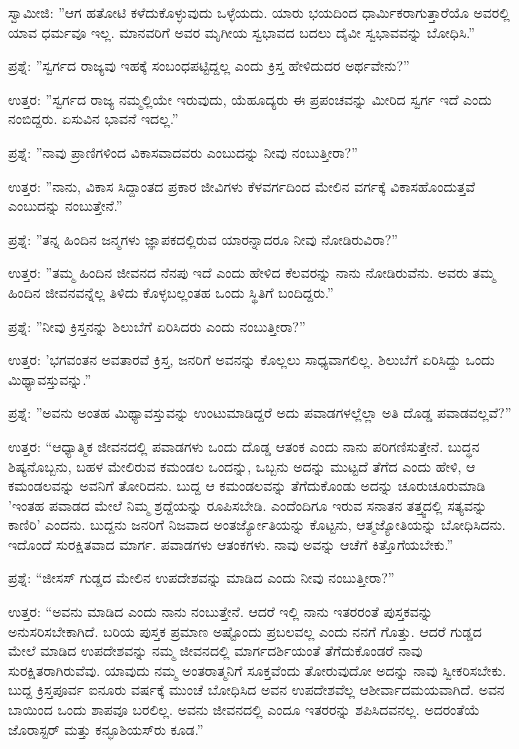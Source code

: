 ಸ್ವಾಮೀಜಿ: ''ಆಗ ಹತೋಟಿ ಕಳೆದುಕೊಳ್ಳುವುದು ಒಳ್ಳೆಯದು. ಯಾರು ಭಯದಿಂದ ಧಾರ್ಮಿಕರಾಗುತ್ತಾರೆಯೊ ಅವರಲ್ಲಿ ಯಾವ ಧರ್ಮವೂ ಇಲ್ಲ. ಮಾನವರಿಗೆ ಅವರ ಮೃಗೀಯ ಸ್ವಭಾವದ ಬದಲು ದೈವೀ ಸ್ವಭಾವವನ್ನು ಬೋಧಿಸಿ.”

ಪ್ರಶ್ನೆ: ''ಸ್ವರ್ಗದ ರಾಜ್ಯವು ಇಹಕ್ಕೆ ಸಂಬಂಧಪಟ್ಟಿದ್ದಲ್ಲ ಎಂದು ಕ್ರಿಸ್ತ ಹೇಳಿದುದರ ಅರ್ಥವೇನು?''

ಉತ್ತರ: ''ಸ್ವರ್ಗದ ರಾಜ್ಯ ನಮ್ಮಲ್ಲಿಯೇ ಇರುವುದು, ಯೆಹೂದ್ಯರು ಈ ಪ್ರಪಂಚವನ್ನು ಮೀರಿದ ಸ್ವರ್ಗ ಇದೆ ಎಂದು ನಂಬಿದ್ದರು. ಏಸುವಿನ ಭಾವನೆ ಇದಲ್ಲ.”

ಪ್ರಶ್ನೆ: ''ನಾವು ಪ್ರಾಣಿಗಳಿಂದ ವಿಕಾಸವಾದವರು ಎಂಬುದನ್ನು ನೀವು ನಂಬುತ್ತೀರಾ?''

ಉತ್ತರ: ''ನಾನು, ವಿಕಾಸ ಸಿದ್ದಾಂತದ ಪ್ರಕಾರ ಜೀವಿಗಳು ಕೆಳವರ್ಗದಿಂದ ಮೇಲಿನ ವರ್ಗಕ್ಕೆ ವಿಕಾಸಹೊಂದುತ್ತವೆ ಎಂಬುದನ್ನು ನಂಬುತ್ತೇನೆ.”

ಪ್ರಶ್ನೆ: ''ತನ್ನ ಹಿಂದಿನ ಜನ್ಮಗಳು ಜ್ಞಾಪಕದಲ್ಲಿರುವ ಯಾರನ್ನಾದರೂ ನೀವು ನೋಡಿರುವಿರಾ?”

ಉತ್ತರ: ''ತಮ್ಮ ಹಿಂದಿನ ಜೀವನದ ನೆನಪು ಇದೆ ಎಂದು ಹೇಳಿದ ಕೆಲವರನ್ನು ನಾನು ನೋಡಿರುವೆನು. ಅವರು ತಮ್ಮ ಹಿಂದಿನ ಜೀವನವನ್ನೆಲ್ಲ ತಿಳಿದು ಕೊಳ್ಳಬಲ್ಲಂತಹ ಒಂದು ಸ್ಥಿತಿಗೆ ಬಂದಿದ್ದರು.''

ಪ್ರಶ್ನೆ: ''ನೀವು ಕ್ರಿಸ್ತನನ್ನು ಶಿಲುಬೆಗೆ ಏರಿಸಿದರು ಎಂದು ನಂಬುತ್ತೀರಾ?”

ಉತ್ತರ: 'ಭಗವಂತನ ಅವತಾರವೆ ಕ್ರಿಸ್ತ, ಜನರಿಗೆ ಅವನನ್ನು ಕೊಲ್ಲಲು ಸಾಧ್ಯವಾಗಲಿಲ್ಲ. ಶಿಲುಬೆಗೆ ಏರಿಸಿದ್ದು ಒಂದು ಮಿಥ್ಯಾವಸ್ತುವನ್ನು.”

ಪ್ರಶ್ನೆ: ''ಅವನು ಅಂತಹ ಮಿಥ್ಯಾವಸ್ತುವನ್ನು ಉಂಟುಮಾಡಿದ್ದರೆ ಅದು ಪವಾಡಗಳಲ್ಲೆಲ್ಲಾ ಅತಿ ದೊಡ್ಡ ಪವಾಡವಲ್ಲವೆ?”

ಉತ್ತರ: “ಆಧ್ಯಾತ್ಮಿಕ ಜೀವನದಲ್ಲಿ ಪವಾಡಗಳು ಒಂದು ದೊಡ್ಡ ಆತಂಕ ಎಂದು ನಾನು ಪರಿಗಣಿಸುತ್ತೇನೆ. ಬುದ್ಧನ ಶಿಷ್ಯನೊಬ್ಬನು, ಬಹಳ ಮೇಲಿರುವ ಕಮಂಡಲ ಒಂದನ್ನು, ಒಬ್ಬನು ಅದನ್ನು ಮುಟ್ಟದೆ ತೆಗೆದ ಎಂದು ಹೇಳಿ, ಆ ಕಮಂಡಲವನ್ನು ಅವನಿಗೆ ತೋರಿದನು. ಬುದ್ದ ಆ ಕಮಂಡಲವನ್ನು ತೆಗೆದುಕೊಂಡು ಅದನ್ನು ಚೂರುಚೂರುಮಾಡಿ 'ಇಂತಹ ಪವಾಡದ ಮೇಲೆ ನಿಮ್ಮ ಶ್ರದ್ದೆಯನ್ನು ರೂಪಿಸಬೇಡಿ. ಎಂದೆಂದಿಗೂ ಇರುವ ಸನಾತನ ತತ್ತ್ವದಲ್ಲಿ ಸತ್ಯವನ್ನು ಕಾಣಿರಿ' ಎಂದನು. ಬುದ್ದನು ಜನರಿಗೆ ನಿಜವಾದ ಅಂತರ್ಜ್ಯೋತಿಯನ್ನು ಕೊಟ್ಟನು, ಆತ್ಮಜ್ಯೋತಿಯನ್ನು ಬೋಧಿಸಿದನು. ಇದೊಂದೆ ಸುರಕ್ಷಿತವಾದ ಮಾರ್ಗ. ಪವಾಡಗಳು ಆತಂಕಗಳು. ನಾವು ಅವನ್ನು ಆಚೆಗೆ ಕಿತ್ತೊಗೆಯಬೇಕು.”

ಪ್ರಶ್ನೆ: “ಜೀಸಸ್ ಗುಡ್ಡದ ಮೇಲಿನ ಉಪದೇಶವನ್ನು ಮಾಡಿದ ಎಂದು ನೀವು ನಂಬುತ್ತೀರಾ?”

ಉತ್ತರ: “ಅವನು ಮಾಡಿದ ಎಂದು ನಾನು ನಂಬುತ್ತೇನೆ. ಆದರೆ ಇಲ್ಲಿ ನಾನು ಇತರರಂತೆ ಪುಸ್ತಕವನ್ನು ಅನುಸರಿಸಬೇಕಾಗಿದೆ. ಬರಿಯ ಪುಸ್ತಕ ಪ್ರಮಾಣ ಅಷ್ಟೊಂದು ಪ್ರಬಲವಲ್ಲ ಎಂದು ನನಗೆ ಗೊತ್ತು. ಆದರೆ ಗುಡ್ಡದ ಮೇಲೆ ಮಾಡಿದ ಉಪದೇಶವನ್ನು ನಮ್ಮ ಜೀವನದಲ್ಲಿ ಮಾರ್ಗದರ್ಶಿಯಂತೆ ತೆಗೆದುಕೊಂಡರೆ ನಾವು ಸುರಕ್ಷಿತರಾಗಿರುವೆವು. ಯಾವುದು ನಮ್ಮ ಅಂತರಾತ್ಮನಿಗೆ ಸೂಕ್ತವೆಂದು ತೋರುವುದೋ ಅದನ್ನು ನಾವು ಸ್ವೀಕರಿಸಬೇಕು. ಬುದ್ದ ಕ್ರಿಸ್ತಪೂರ್ವ ಐನೂರು ವರ್ಷಕ್ಕೆ ಮುಂಚೆ ಬೋಧಿಸಿದ ಅವನ ಉಪದೇಶವೆಲ್ಲ ಆಶೀರ್ವಾದಮಯವಾಗಿದೆ. ಅವನ ಬಾಯಿಂದ ಒಂದು ಶಾಪವೂ ಬರಲಿಲ್ಲ. ಅವನು ಜೀವನದಲ್ಲಿ ಎಂದೂ ಇತರರನ್ನು ಶಪಿಸಿದವನಲ್ಲ. ಅದರಂತೆಯೆ ಜೊರಾಸ್ಟರ್‌ ಮತ್ತು ಕನ್ಫೂಶಿಯಸ್‌ರು ಕೂಡ.”

